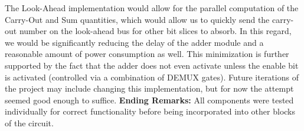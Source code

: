 \documentclass[12pt]{article}
\begin{document}
	\newline \newline
	The Look-Ahead implementation would allow for the parallel computation of the Carry-Out and
	Sum quantities, which would allow us to quickly send the carry-out number on the look-ahead
	bus for other bit slices to absorb. In this regard, we would be significantly reducing the delay
	of the adder module and a reasonable amount of power consumption as well. This minimization
	is further supported by the fact that the adder does not even activate unless the enable bit
	is activated (controlled via a combination of DEMUX gates). Future iterations of the project 
	may include changing this implementation, but for now the attempt seemed good enough to
	suffice.
	\newline \newline
	\textbf{Ending Remarks:}
	\newline \newline
	All components were tested individually for correct functionality before being incorporated 
	into other blocks of the circuit.
	\newline \newline
	
\end{document}
